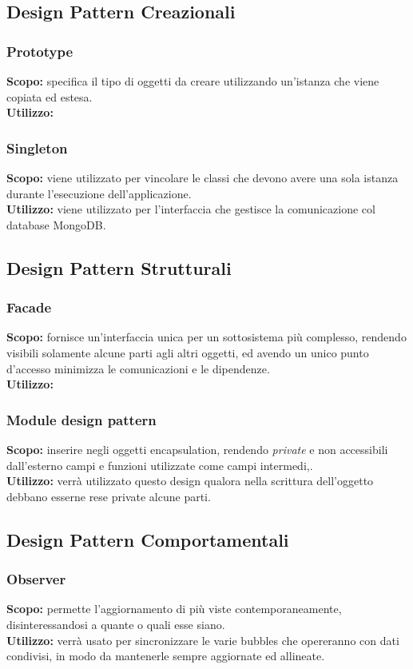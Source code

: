 \subsection{Design Pattern Creazionali}

\subsubsection{Prototype}
\textbf{Scopo:} specifica il tipo di oggetti da creare utilizzando un'istanza  che viene copiata ed estesa.\\
\textbf{Utilizzo:} 

\subsubsection{Singleton}
\textbf{Scopo:} viene utilizzato per vincolare le classi che devono avere una sola istanza durante l'esecuzione dell'applicazione.\\
\textbf{Utilizzo:} viene utilizzato per l'interfaccia che gestisce la comunicazione col database MongoDB.

\subsection{Design Pattern Strutturali}

\subsubsection{Facade}
\textbf{Scopo:} fornisce un'interfaccia unica per un sottosistema più complesso, rendendo visibili solamente alcune parti agli altri oggetti, ed avendo un unico punto d'accesso minimizza le comunicazioni e le dipendenze.\\
\textbf{Utilizzo:} 


\subsubsection{Module design pattern}
\textbf{Scopo:} inserire negli oggetti encapsulation, rendendo \textit{private} e non accessibili dall'esterno campi e funzioni utilizzate come campi intermedi,.\\
\textbf{Utilizzo:} verrà utilizzato questo design qualora nella scrittura dell'oggetto debbano esserne rese private alcune parti.

\subsection{Design Pattern Comportamentali}

\subsubsection{Observer}
\textbf{Scopo:} permette l'aggiornamento di più viste contemporaneamente, disinteressandosi a quante o quali esse siano.\\
\textbf{Utilizzo:} verrà usato per sincronizzare le varie bubbles che opereranno con dati condivisi, in modo da mantenerle sempre aggiornate ed allineate.